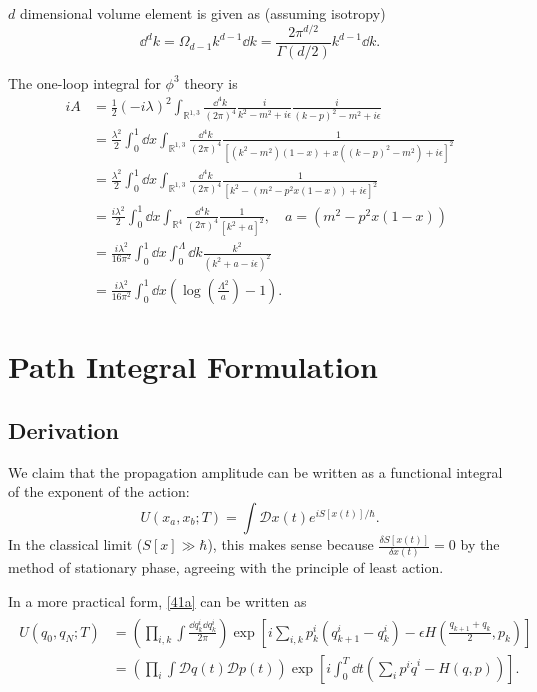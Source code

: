 \documentclass{article}
\begin{document}
$d$ dimensional volume element is given as (assuming isotropy)
\begin{equation}
    \dd^dk=\Omega_{d-1}k^{d-1}\dd k=\frac{2\pi^{d/2}}{\Gamma(d/2)}k^{d-1}\dd k.
\end{equation}

The one-loop integral for $\phi^3$ theory is 
\begin{align*}
    iA&=\frac 12(-i\lambda)^2\int_{\mathbb R^{1,3}}\frac{\dd^4k}{(2\pi)^4}\frac{i}{k^2-m^2+i\epsilon}\frac{i}{(k-p)^2-m^2+i\epsilon}\\
    &=\frac{\lambda^2}{2}\int^1_0\dd x\int_{\mathbb R^{1,3}}\frac{\dd^4k}{(2\pi)^4}\frac{1}{[(k^2-m^2)(1-x)+x((k-p)^2-m^2)+i\epsilon]^2}\\
    &=\frac{\lambda^2}{2}\int^1_0\dd x\int_{\mathbb R^{1,3}}\frac{\dd^4k}{(2\pi)^4}\frac{1}{[k^2-(m^2-p^2x(1-x))+i\epsilon]^2}\\
    &=\frac{i\lambda^2}{2}\int^1_0\dd x\int_{\mathbb R^4}\frac{\dd^4k}{(2\pi)^4}\frac{1}{[k^2+a]^2},\quad a=(m^2-p^2x(1-x))\\
    &=\frac{i\lambda^2}{16\pi^2}\int^1_0\dd x\int^\Lambda_0\dd k\frac{k^2}{(k^2+a-i\epsilon)^2}\\
    &=\frac{i\lambda^2}{16\pi^2}\int^1_0\dd x\left(\log\left(\frac{\Lambda^2}{a}\right)-1\right).
\end{align*}


\pagebreak

\section{Path Integral Formulation}

\subsection{Derivation}

We claim that the propagation amplitude can be written as a functional integral of the exponent of the action:
\begin{equation}
    U(x_a,x_b;T)=\int\mathcal Dx(t)e^{iS[x(t)]/\hbar}.
    \label{41a}
\end{equation}
In the classical limit ($S[x]\gg\hbar$), this makes sense because $\frac{\delta S[x(t)]}{\delta x(t)}=0$ by the method of stationary phase, agreeing with the principle of least action. 

In a more practical form, \eqref{41a} can be written as 
\begin{align}
    \begin{split}
        U(q_0,q_N;T)&=\left(\prod_{i,k}\int\frac{\dd q^i_k\dd q^i_k}{2\pi}\right)\exp\left[i\sum_{i,k}p^i_k(q^i_{k+1}-q^i_k)-\epsilon H\left(\frac{q_{k+1}+q_k}{2},p_k\right)\right]\\
        &=\left(\prod_i\int\mathcal Dq(t)\mathcal Dp(t)\right)\exp\left[i\int^T_0\dd t\left(\sum_ip^i\dot q^i-H(q,p)\right)\right].
    \end{split}
\end{align}
\end{document}
